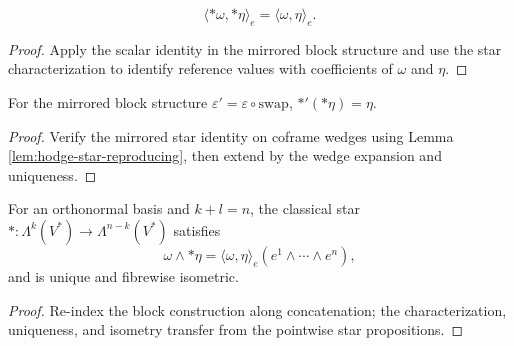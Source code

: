 \begin{proposition}
\label{prop:hodge-star-isometry}





\[
\langle {*}\omega,{*}\eta\rangle_e=\langle\omega,\eta\rangle_e.
\]
\end{proposition}
\begin{proof}

\sketch Apply the scalar identity in the mirrored block structure and use the star characterization to identify reference values with coefficients of $\omega$ and $\eta$.
\end{proof}

\begin{proposition}
\label{prop:hodge-star-involution}





For the mirrored block structure $\varepsilon'=\varepsilon\circ\mathrm{swap}$, $*'(*\eta)=\eta$.
\end{proposition}
\begin{proof}

\sketch Verify the mirrored star identity on coframe wedges using Lemma \ref{lem:hodge-star-reproducing}, then extend by the wedge expansion and uniqueness.
\end{proof}

\begin{proposition}
\label{prop:hodge-star-graded}





For an orthonormal basis and $k+l=n$, the classical star $*:\Lambda^k(V^*)\to\Lambda^{n-k}(V^*)$ satisfies
\[
\omega\wedge {*}\eta=\langle\omega,\eta\rangle_e(e^1\wedge\cdots\wedge e^n),
\]
and is unique and fibrewise isometric.
\end{proposition}
\begin{proof}

\sketch Re-index the block construction along concatenation; the characterization, uniqueness, and isometry transfer from the pointwise star propositions.
\end{proof}


